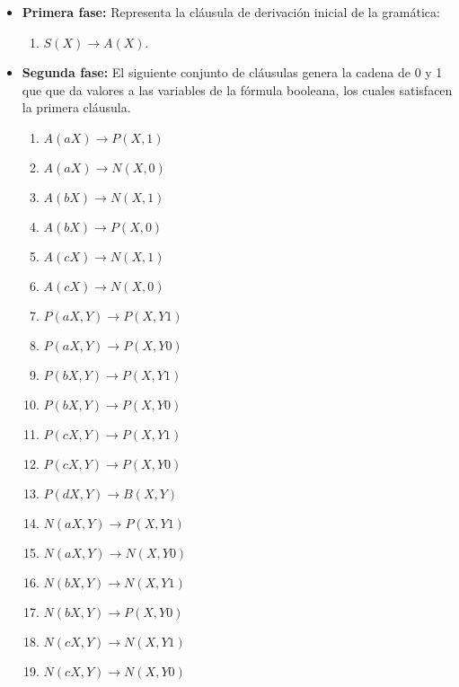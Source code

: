 \documentclass[12pt]{article}
\begin{document}
\begin{itemize}
    \item \textbf{Primera fase:} Representa la cláusula de derivación inicial de la gramática:
          \begin{enumerate}
              \item $S(X)\to A(X)$.
          \end{enumerate}

    \item \textbf{Segunda fase:} El siguiente conjunto de cláusulas genera la cadena de 0 y 1 que que da
          valores a las variables de la fórmula booleana, los cuales satisfacen la primera cláusula.
          \begin{multicols}{2}
              \begin{enumerate}[start=2]
                  \item $A(aX)\to P(X,1)$
                  \item $A(aX)\to N(X,0)$
                  \item $A(bX)\to N(X,1)$
                  \item $A(bX)\to P(X,0)$
                  \item $A(cX)\to N(X,1)$
                  \item $A(cX)\to N(X,0)$

                  \item $P(aX,Y)\to P(X,Y1)$
                  \item $P(aX,Y)\to P(X,Y0)$
                  \item $P(bX,Y)\to P(X,Y1)$
                  \item $P(bX,Y)\to P(X,Y0)$
                  \item $P(cX,Y)\to P(X,Y1)$
                  \item $P(cX,Y)\to P(X,Y0)$
                  \item $P(dX,Y)\to B(X,Y)$

                  \item $N(aX,Y)\to P(X,Y1)$
                  \item $N(aX,Y)\to N(X,Y0)$
                  \item $N(bX,Y)\to N(X,Y1)$
                  \item $N(bX,Y)\to P(X,Y0)$
                  \item $N(cX,Y)\to N(X,Y1)$
                  \item $N(cX,Y)\to N(X,Y0)$
              \end{enumerate}
          \end{multicols}


\end{itemize}
\end{document}
